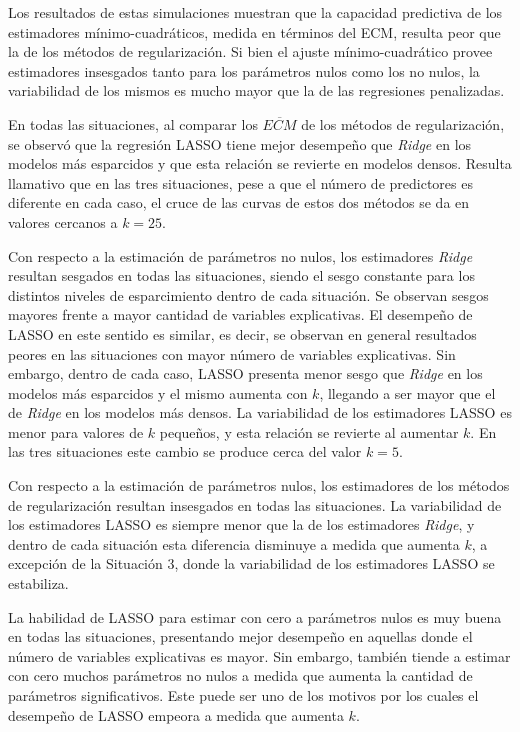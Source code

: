 \documentclass[a4paper,12pt]{report}
\begin{document}
Los resultados de estas simulaciones muestran que la capacidad predictiva de los estimadores mínimo-cuadráticos, medida en términos del ECM, resulta peor que la de los métodos de regularización. Si bien el ajuste mínimo-cuadrático provee estimadores insesgados tanto para los parámetros nulos como los no nulos, la variabilidad de los mismos es mucho mayor que la de las regresiones penalizadas.

En todas las situaciones, al comparar los $\overline{ECM}$ de los métodos de regularización, se observó que la regresión LASSO tiene mejor desempeño que \textit{Ridge} en los modelos más esparcidos y que esta relación se revierte en modelos densos. Resulta llamativo que en las tres situaciones, pese a que el número de predictores es diferente en cada caso, el cruce de las curvas de estos dos métodos se da en valores cercanos a $k=25$.

Con respecto a la estimación de parámetros no nulos, los estimadores \textit{Ridge} resultan sesgados en todas las situaciones, siendo el sesgo constante para los distintos niveles de esparcimiento dentro de cada situación. Se observan sesgos mayores frente a mayor cantidad de variables explicativas. El desempeño de LASSO en este sentido es similar, es decir, se observan en general resultados peores en las situaciones con mayor número de variables explicativas. Sin embargo, dentro de cada caso, LASSO presenta menor sesgo que \textit{Ridge} en los modelos más esparcidos y el mismo aumenta con $k$, llegando a ser mayor que el de \textit{Ridge} en los modelos más densos. La variabilidad de los estimadores LASSO es menor para valores de $k$ pequeños, y esta relación se revierte al aumentar $k$. En las tres situaciones este cambio se produce cerca del valor $k=5$.

Con respecto a la estimación de parámetros nulos, los estimadores de los métodos de regularización resultan insesgados en todas las situaciones. La variabilidad de los estimadores LASSO es siempre menor que la de los estimadores \textit{Ridge}, y dentro de cada situación esta diferencia disminuye a medida que aumenta $k$, a excepción de la Situación 3, donde la variabilidad de los estimadores LASSO se estabiliza.

La habilidad de LASSO para estimar con cero a parámetros nulos es muy buena en todas las situaciones, presentando mejor desempeño en aquellas donde el número de variables explicativas es mayor. Sin embargo, también tiende a estimar con cero muchos parámetros no nulos a medida que aumenta la cantidad de parámetros significativos. Este puede ser uno de los motivos por los cuales el desempeño de LASSO empeora a medida que aumenta $k$.
\end{document}

